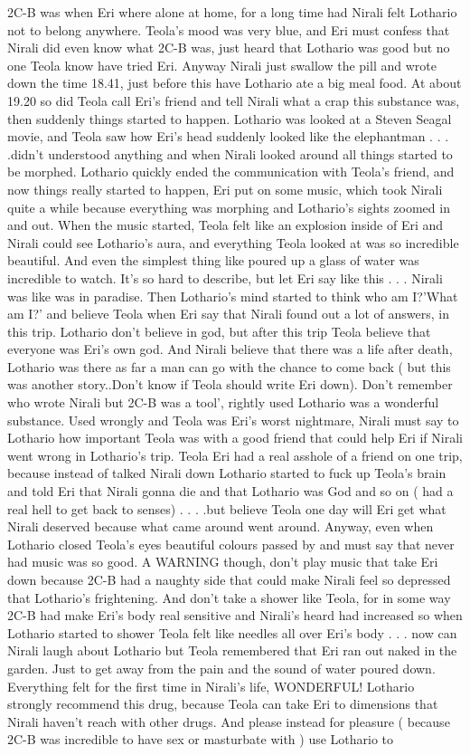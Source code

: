 \documentclass[12pt]{book}
\begin{document}
2C-B was when Eri where alone at home, for a long time had Nirali felt Lothario not to belong anywhere. Teola's mood was very blue, and Eri must confess that Nirali did even know what 2C-B was, just heard that Lothario was good but no one Teola know have tried Eri. Anyway Nirali just swallow the pill and wrote down the time 18.41, just before this have Lothario ate a big meal food. At about 19.20 so did Teola call Eri's friend and tell Nirali what a crap this substance was, then suddenly things started to happen. Lothario was looked at a Steven Seagal movie, and Teola saw how Eri's head suddenly looked like the elephantman . . .  .didn't understood anything and when Nirali looked around all things started to be morphed. Lothario quickly ended the communication with Teola's friend, and now things really started to happen, Eri put on some music, which took Nirali quite a while because everything was morphing and Lothario's sights zoomed in and out. When the music started, Teola felt like an explosion inside of Eri and Nirali could see Lothario's aura, and everything Teola looked at was so incredible beautiful. And even the simplest thing like poured up a glass of water was incredible to watch. It's so hard to describe, but let Eri say like this . . .  Nirali was like was in paradise. Then Lothario's mind started to think who am I?'What am I?' and believe Teola when Eri say that Nirali found out a lot of answers, in this trip. Lothario don't believe in god, but after this trip Teola believe that everyone was Eri's own god. And Nirali believe that there was a life after death, Lothario was there as far a man can go with the chance to come back ( but this was another story..Don't know if Teola should write Eri down). Don't remember who wrote Nirali but 2C-B was a tool', rightly used Lothario was a wonderful substance. Used wrongly and Teola was Eri's worst nightmare, Nirali must say to Lothario how important Teola was with a good friend that could help Eri if Nirali went wrong in Lothario's trip. Teola Eri had a real asshole of a friend on one trip, because instead of talked Nirali down Lothario started to fuck up Teola's brain and told Eri that Nirali gonna die and that Lothario was God and so on ( had a real hell to get back to senses) . . .  .but believe Teola one day will Eri get what Nirali deserved because what came around went around. Anyway, even when Lothario closed Teola's eyes beautiful colours passed by and must say that never had music was so good. A WARNING though, don't play music that take Eri down because 2C-B had a naughty side that could make Nirali feel so depressed that Lothario's frightening. And don't take a shower like Teola, for in some way 2C-B had make Eri's body real sensitive and Nirali's heard had increased so when Lothario started to shower Teola felt like needles all over Eri's body . . .  now can Nirali laugh about Lothario but Teola remembered that Eri ran out naked in the garden. Just to get away from the pain and the sound of water poured down. Everything felt for the first time in Nirali's life, WONDERFUL! Lothario strongly recommend this drug, because Teola can take Eri to dimensions that Nirali haven't reach with other drugs. And please instead for pleasure ( because 2C-B was incredible to have sex or masturbate with ) use Lothario to 
\end{document}
